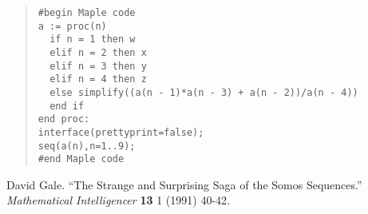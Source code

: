 \documentclass[10pt]{article}
\begin{document}
\begin{quote}
\begin{verbatim}
#begin Maple code
a := proc(n)
  if n = 1 then w
  elif n = 2 then x
  elif n = 3 then y
  elif n = 4 then z
  else simplify((a(n - 1)*a(n - 3) + a(n - 2))/a(n - 4))
  end if
end proc:
interface(prettyprint=false);
seq(a(n),n=1..9);
#end Maple code
\end{verbatim}
\end{quote}


\begin{thebibliography}{9}

{\sc David Gale.}  ``The Strange and Surprising Saga of the Somos
Sequences.''  \emph{Mathematical Intelligencer} \textbf{13} 1 (1991)
40-42.

\end{thebibliography}
\end{document}

